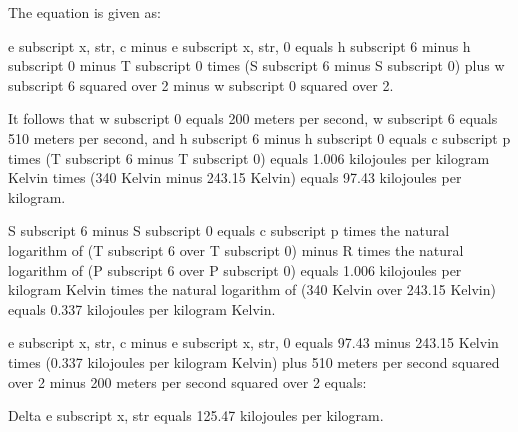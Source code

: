 The equation is given as:

e subscript x, str, c minus e subscript x, str, 0 equals h subscript 6 minus h subscript 0 minus T subscript 0 times (S subscript 6 minus S subscript 0) plus w subscript 6 squared over 2 minus w subscript 0 squared over 2.

It follows that w subscript 0 equals 200 meters per second, w subscript 6 equals 510 meters per second, and h subscript 6 minus h subscript 0 equals c subscript p times (T subscript 6 minus T subscript 0) equals 1.006 kilojoules per kilogram Kelvin times (340 Kelvin minus 243.15 Kelvin) equals 97.43 kilojoules per kilogram.

S subscript 6 minus S subscript 0 equals c subscript p times the natural logarithm of (T subscript 6 over T subscript 0) minus R times the natural logarithm of (P subscript 6 over P subscript 0) equals 1.006 kilojoules per kilogram Kelvin times the natural logarithm of (340 Kelvin over 243.15 Kelvin) equals 0.337 kilojoules per kilogram Kelvin.

e subscript x, str, c minus e subscript x, str, 0 equals 97.43 minus 243.15 Kelvin times (0.337 kilojoules per kilogram Kelvin) plus 510 meters per second squared over 2 minus 200 meters per second squared over 2 equals:

Delta e subscript x, str equals 125.47 kilojoules per kilogram.
